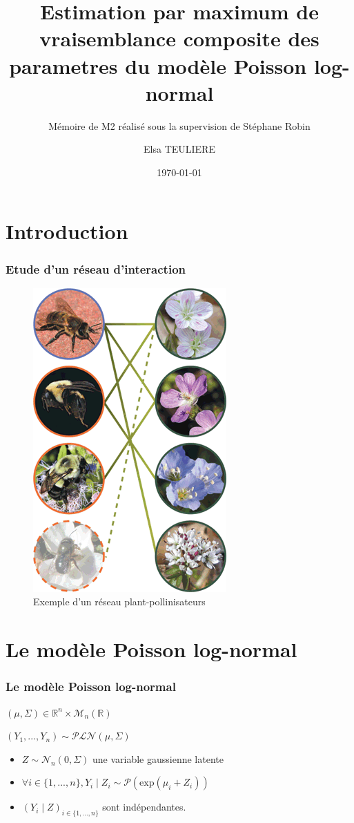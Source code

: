 \documentclass[11pt,table]{beamer}
\title %
{Estimation par maximum de vraisemblance composite des parametres du modèle Poisson log-normal}
\subtitle{Mémoire de M2 réalisé sous la supervision de Stéphane Robin}
\author[Elsa TEULIERE] %
{Elsa TEULIERE}
\institute[UPMC] %
{
  Master 2 Probabilités et modèles aléatoires}
\date[\today] %
{\today}
\begin{document}
\begin{frame}
  \titlepage

\end{frame}
\section*{Introduction}

\begin{frame}
\frametitle{Etude d'un réseau d'interaction}
\begin{figure}
\includegraphics[scale=0.3]{Plant_polinisator.png}
\caption{Exemple d'un réseau plant-pollinisateurs} 
\end{figure}
\end{frame}

\section{Le modèle Poisson log-normal}
\begin{frame}
\frametitle{Le modèle Poisson log-normal}
$(\mu, \Sigma) \in \mathbb{R}^n \times \mathcal{M}_n(\mathbb{R})$\\
\vspace{0.5cm}

$(Y_1,...,Y_n) \sim \mathcal{PLN} (\mu,\Sigma)$  \\

\begin{itemize}
\item  $Z \sim \mathcal{N}_n(0,\Sigma)$ une variable gaussienne  latente

\item$\forall i \in \{1,...,n\}, Y_i\mid Z_i \sim \mathcal{P}(\mathrm{exp}(\mu_i+Z_i))$

\item $(Y_i\mid Z )_{i \in \{1,...,n\}}$ sont indépendantes.
\end{itemize}
\end{frame}
\end{document}
